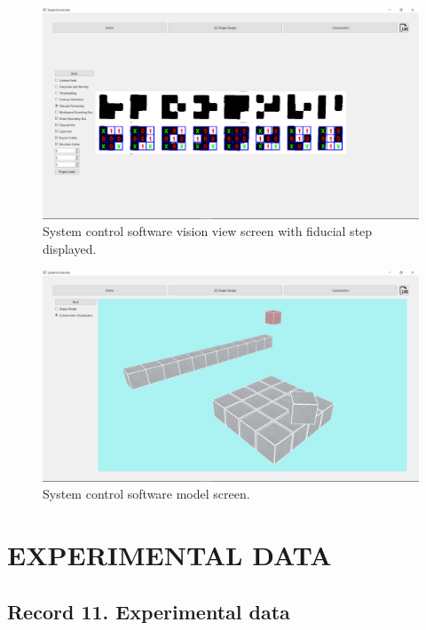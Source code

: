 \begin{figure}[!ht]
	\centering
	\includegraphics[width=1\linewidth]{figures/gui-vision-view-fiducial.png}
	\caption{System control software vision view screen with fiducial step displayed.}
	\label{fig:gui-vision-view-fiducial}
\end{figure}

\begin{figure}[!ht]
	\centering
	\includegraphics[width=1\linewidth]{figures/gui-model-view.png}
	\caption{System control software model screen.}
	\label{fig:gui-vision-view-model}
\end{figure}

\newpage


\section{EXPERIMENTAL DATA}

\subsection{Record 11. Experimental data}

